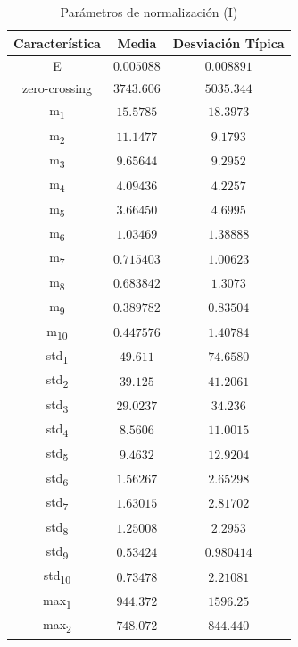 \documentclass[12pt]{article}
\begin{document}
\begin{table}[!ht]
	\caption{Parámetros de normalización (I)}
	\centering
		\begin{tabular}{||c c c||}
			\hline
			Característica & Media & Desviación Típica  \\ [0.5ex]
			\hline\hline
			E & $0.005088$ & $0.008891$ \\
			\hline
			zero-crossing & $3743.606$ & $5035.344$ \\
			\hline
			m\textsubscript{1} & $15.5785$ & $18.3973$ \\
			\hline
			m\textsubscript{2} & $11.1477$ & $9.1793$ \\
			\hline
			m\textsubscript{3} & $9.65644$ & $9.2952$ \\
			\hline
			m\textsubscript{4} & $4.09436$ & $4.2257$ \\
			\hline
			m\textsubscript{5} & $3.66450$ & $4.6995$ \\
			\hline
			m\textsubscript{6} & $1.03469$ & $1.38888$ \\
			\hline
			m\textsubscript{7} & $0.715403$ & $1.00623$ \\
			\hline
			m\textsubscript{8} & $0.683842$ & $1.3073$ \\
			\hline
			m\textsubscript{9} & $0.389782$ & $0.83504$ \\
			\hline
			m\textsubscript{10} & $0.447576$ & $1.40784$ \\
			\hline
			std\textsubscript{1} & $49.611$ & $74.6580$ \\
			\hline
			std\textsubscript{2} & $39.125$ & $41.2061$ \\
			\hline
			std\textsubscript{3} & $29.0237$ & $34.236$ \\
			\hline
			std\textsubscript{4} & $8.5606$ & $11.0015$ \\
			\hline
			std\textsubscript{5} & $9.4632$ & $12.9204$ \\
			\hline
			std\textsubscript{6} & $1.56267$ & $2.65298$ \\
			\hline
			std\textsubscript{7} & $1.63015$ & $2.81702$ \\
			\hline
			std\textsubscript{8} & $1.25008$ & $2.2953$ \\
			\hline
			std\textsubscript{9} & $0.53424$ & $0.980414$ \\
			\hline
			std\textsubscript{10} & $0.73478$ & $2.21081$ \\
			\hline
			max\textsubscript{1} & $944.372$ & $1596.25$ \\
			\hline
			max\textsubscript{2} & $748.072$ & $844.440$ \\

\end{tabular}
\end{table}
\end{document}
